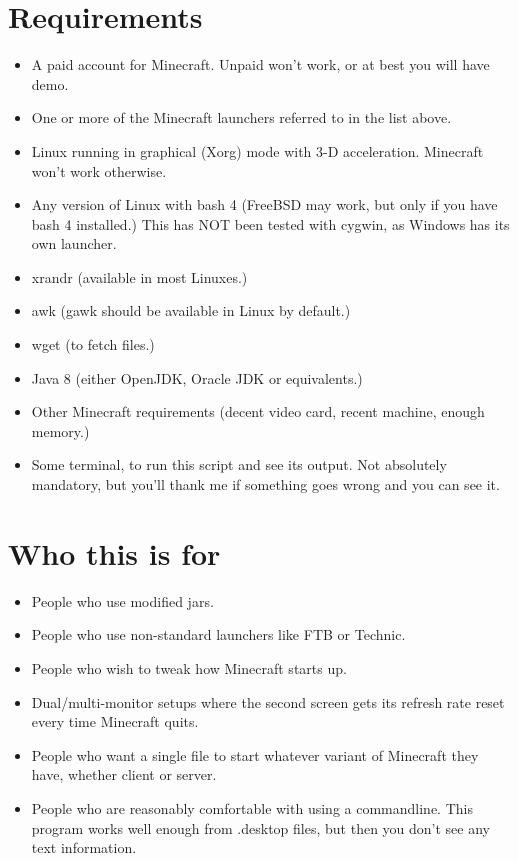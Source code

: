 \documentclass[10pt,a4paper]{book}
\begin{document}
\section*{Requirements}
\begin{itemize}
  \item A paid account for Minecraft. Unpaid won't work, or at best you will have demo.
  \item One or more of the Minecraft launchers referred to in the list above.
  \item Linux running in graphical (Xorg) mode with 3-D acceleration. Minecraft won't work otherwise.
  \item Any version of Linux with bash 4 (FreeBSD may work, but only if you have bash 4 installed.) This has NOT been tested with cygwin, as Windows has its own launcher.
  \item xrandr (available in most Linuxes.)
  \item awk (gawk should be available in Linux by default.)
  \item wget (to fetch files.)
  \item Java 8 (either OpenJDK, Oracle JDK or equivalents.)
  \item Other Minecraft requirements (decent video card, recent machine, enough memory.)
  \item Some terminal, to run this script and see its output. Not absolutely mandatory, but you'll thank me if something goes wrong and you can see it.
\end{itemize}

\section*{Who this is for}
\begin{itemize}
\item People who use modified jars.
\item People who use non-standard launchers like FTB or Technic.
\item People who wish to tweak how Minecraft starts up.
\item Dual/multi-monitor setups where the second screen gets its refresh rate reset every time
  Minecraft quits.
\item People who want a single file to start whatever variant of Minecraft they have,
  whether client or server.
\item People who are reasonably comfortable with using a commandline. This program
  works well enough from .desktop files, but then you don't see any text information.
\end{itemize}
\end{document}
